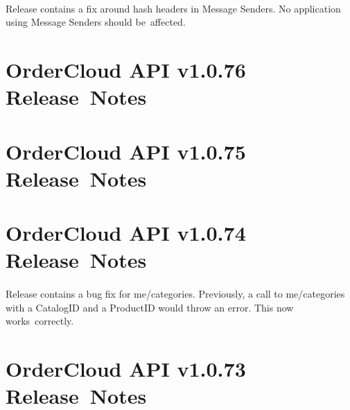 \documentclass{memoir}%
\begin{document}
\paragraph*{}%

%
\paragraph*{}%
Release contains a fix around hash headers in Message Senders. No application using Message Senders should be~affected.

%
\section*{OrderCloud API v1.0.76 Release~Notes}%
\paragraph*{}%

%
\section*{OrderCloud API v1.0.75 Release~Notes}%
\paragraph*{}%

%
\section*{OrderCloud API v1.0.74 Release~Notes}%
\paragraph*{}%

%
\paragraph*{}%
Release contains a bug fix for me/categories. Previously, a call to me/categories with a CatalogID and a ProductID would throw an error. This now works~correctly.

%
\section*{OrderCloud API v1.0.73 Release~Notes}%
\paragraph*{}%
\end{document}
